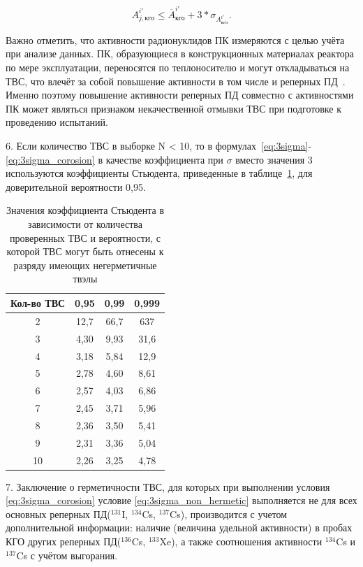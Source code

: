 \begin{equation} \label{eq:3sigma_corosion}
	A_{j,кго}^{i'} \leq \overline{A}_{кго}^{i'} + 3*\sigma_{{A}_{кго}^{i'}}.
\end{equation}

Важно отметить, что активности радионуклидов ПК измеряются с целью учёта при анализе данных. ПК, образующиеся в конструкционных материалах реактора по мере эксплуатации, переносятся по теплоносителю и могут откладываться на ТВС, что влечёт за собой повышение активности в том числе и реперных ПД~\cite{corosion}. Именно поэтому повышение активности реперных ПД совместно с активностями ПК может являться признаком некачественной отмывки ТВС при подготовке к проведению испытаний.

6. Если количество ТВС в выборке N < 10, то в формулах~\ref{eq:3sigma}-\ref{eq:3sigma_corosion}  в качестве коэффициента при $\sigma$  вместо значения 3 используются коэффициенты Стьюдента, приведенные в таблице~\ref{tab:Student}, для доверительной вероятности 0,95.
\begin{table}[H]
	\caption{Значения коэффициента Стьюдента в зависимости от количества проверенных ТВС и вероятности, с которой ТВС могут быть отнесены к разряду имеющих негерметичные твэлы} \label{tab:Student}
	\centering
	\begin{tabular}{|c|c|c|c|}
		\hline Кол-во ТВС & 0,95 & 0,99 & 0,999 \\ 
		\hline  2 & 12,7 & 66,7  & 637 \\ 
		\hline 3 &  4,30 &  9,93 & 31,6 \\ 
		\hline 4 &  3,18 &  5,84 & 12,9 \\ 
		\hline 5 &  2,78 &  4,60 & 8,61 \\ 
		\hline 6 &  2,57 &  4,03 & 6,86 \\ 
		\hline 7 &  2,45 &  3,71 & 5,96 \\ 
		\hline 8 &  2,36 &  3,50 & 5,41 \\ 
		\hline 9 &  2,31 &  3,36 & 5,04 \\ 
		\hline 10 & 2,26 &  3,25 & 4,78 \\ 
		\hline 
	\end{tabular} 
\end{table} 

7. Заключение о герметичности ТВС, для которых при выполнении
условия \ref{eq:3sigma_corosion} условие \ref{eq:3sigma_non_hermetic} выполняется не для всех основных реперных ПД($^{131}$I, $^{134}$Cs, $^{137}$Cs), производится с учетом дополнительной информации: наличие
(величина удельной активности) в пробах КГО других реперных ПД($^{136}$Cs, $^{133}$Xe), а также соотношения активности $^{134}$Cs и $^{137}$Cs с учётом выгорания.

